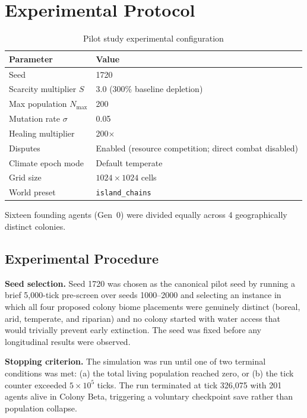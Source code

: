 \documentclass[12pt,a4paper]{article}
\begin{document}
\section{Experimental Protocol}

\begin{table}[h]
\centering
\caption{Pilot study experimental configuration}
\label{tab:config}
\begin{tabularx}{\linewidth}{l X}
\toprule
\textbf{Parameter} & \textbf{Value} \\
\midrule
Seed & 1720 \\
Scarcity multiplier $S$ & $3.0$ (300\% baseline depletion) \\
Max population $N_{\max}$ & 200 \\
Mutation rate $\sigma$ & 0.05 \\
Healing multiplier & 200$\times$ \\
Disputes & Enabled (resource competition; direct combat disabled) \\
Climate epoch mode & Default temperate \\
Grid size & $1024 \times 1024$ cells \\
World preset & \texttt{island\_chains} \\
\bottomrule
\end{tabularx}
\end{table}

Sixteen founding agents (Gen~0) were divided equally across 4 geographically distinct colonies.

\subsection{Experimental Procedure}

\textbf{Seed selection.}
Seed 1720 was chosen as the canonical pilot seed by running a brief 5,000-tick pre-screen over seeds 1000--2000 and selecting an instance in which all four proposed colony biome placements were genuinely distinct (boreal, arid, temperate, and riparian) and no colony started with water access that would trivially prevent early extinction. The seed was fixed before any longitudinal results were observed.

\textbf{Stopping criterion.}
The simulation was run until one of two terminal conditions was met: (a) the total living population reached zero, or (b) the tick counter exceeded $5{\times}10^5$ ticks. The run terminated at tick 326,075 with 201 agents alive in Colony Beta, triggering a voluntary checkpoint save rather than population collapse.
\end{document}
